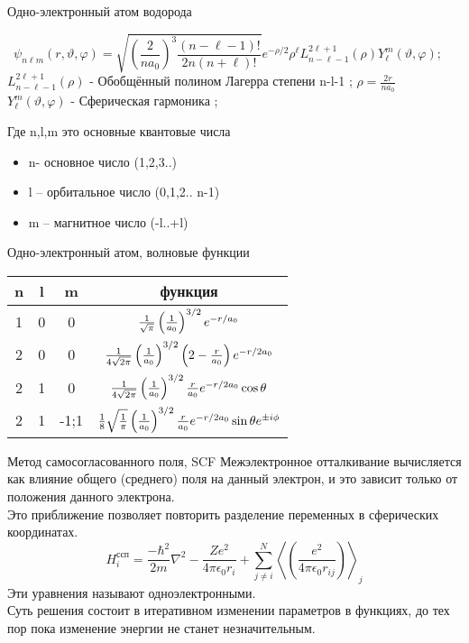 \begin{frame}{Одно-электронный атом водорода}
    \footnotesize{

\[\psi_{n\ell m}(r,\vartheta,\varphi) = \sqrt {{\left (  \frac{2}{n a_0} \right )}^3\frac{(n-\ell-1)!}{2n(n+\ell)!} } e^{-
\rho / 2} \rho^{\ell} L_{n-\ell-1}^{2\ell+1}(\rho) Y_{\ell}^{m}(\vartheta, \varphi ); \quad \]
$  L_{n-\ell-1}^{2\ell+1}(\rho)$ - Обобщённый полином Лагерра степени n-l-1 ; 
\( \rho=\frac{2r}{na_0}\)\\
$Y_{\ell}^{m}(\vartheta, \varphi ) $ - Сферическая гармоника  ;
\\
}
\vspace{0.2cm}
\small{
Где n,l,m это основные квантовые числа
\begin{itemize}
    \item n- основное число (1,2,3..)
    \item l – орбитальное число (0,1,2.. n-1)
    \item m – магнитное число (-l..+l)
\end{itemize}
}
\end{frame}

\begin{frame}{Одно-электронный атом, волновые функции}
    \centering
    \begin{tabular}{ccc|c}
        n & l & m & функция \rule[-0.9ex]{0pt}{0pt}\\
        \hline 
        1 & 0 & 0 & ${1\over \sqrt{\pi}}\left({1\over a_0}\right)^{3/2}e^{-r/a_0}$  \\[0.5cm]
        2 & 0 & 0 & ${1\over 4\sqrt{2\pi}}\left({1\over a_0}\right)^{3/2}\left(2-{r\over a_0}\right)e^{-r/2a_0}$ \\[0.5cm]
        2 & 1 & 0 & $ {1\over 4\sqrt{2\pi}}\left({1\over a_0}\right)^{3/2} {r\over a_0}e^{-r/2a_0}\cos{\theta}$ \\[0.5cm]
        2 & 1 & -1;1 & ${1\over 8} \sqrt{1\over \pi} \left({1\over a_0}\right)^{3/2}{r\over a_0}e^{-r/2a_0}\sin{\theta}e^{\pm
            i\phi}$ \\[0.5cm]
    \end{tabular}
\end{frame}


\begin{frame}{Метод самосогласованного поля, SCF}
    Межэлектронное отталкивание вычисляется как влияние общего (среднего) поля на данный электрон, и это зависит только
    от положения данного электрона. 
    \\
    Это приближение позволяет повторить разделение переменных  в сферических  координатах.
    \[ H^{ссп}_i= \frac{-\hbar^2}{2m} \nabla^2 - \frac{Ze^2}{4\pi\epsilon_0r_i} + \sum_{j\neq i}^{N}\left\langle \left (
        \frac{e^2}{4\pi\epsilon_0r_{ij}} \right ) \right\rangle _j
        \]
        Эти уравнения называют одноэлектронными. \\
        Суть решения состоит в итеративном изменении параметров в функциях, до тех пор пока изменение энергии не станет
        незначительным.

\end{frame}


